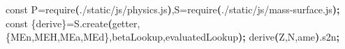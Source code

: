 \documentclass[
  11pt,
  letterpaper,
]{article}
\newenvironment{Shaded}{}{}
\newcommand{\DataTypeTok}[1]{\textcolor[rgb]{0.56,0.13,0.00}{#1}}
\newcommand{\ErrorTok}[1]{\textcolor[rgb]{1.00,0.00,0.00}{\textbf{#1}}}
\newcommand{\ExtensionTok}[1]{#1}
\newcommand{\KeywordTok}[1]{\textcolor[rgb]{0.00,0.44,0.13}{\textbf{#1}}}
\newcommand{\NormalTok}[1]{#1}
\newcommand{\OperatorTok}[1]{\textcolor[rgb]{0.40,0.40,0.40}{#1}}
\newcommand{\StringTok}[1]{\textcolor[rgb]{0.25,0.44,0.63}{#1}}
\begin{document}
\begin{Shaded}
\begin{Highlighting}[]
\ExtensionTok{const}\NormalTok{ P=require}\ErrorTok{(}\StringTok{\textquotesingle{}./static/js/physics.js\textquotesingle{}}\KeywordTok{)}\ExtensionTok{,S=require}\ErrorTok{(}\StringTok{\textquotesingle{}./static/js/mass{-}surface.js\textquotesingle{}}\KeywordTok{);} \ExtensionTok{const}\NormalTok{ \{derive\}=S.create}\ErrorTok{(}\ExtensionTok{getter,}\DataTypeTok{\{MEn}\OperatorTok{,}\DataTypeTok{MEH}\OperatorTok{,}\DataTypeTok{MEa}\OperatorTok{,}\DataTypeTok{MEd\}}\ExtensionTok{,betaLookup,evaluatedLookup}\KeywordTok{);} \ExtensionTok{derive}\ErrorTok{(}\ExtensionTok{Z,N,}\StringTok{\textquotesingle{}ame\textquotesingle{}}\KeywordTok{)}\ExtensionTok{.s2n}\KeywordTok{;}
\end{Highlighting}
\end{Shaded}
\end{document}
